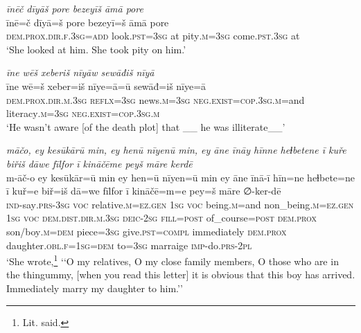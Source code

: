 \ea \label{KŠ.73}
\textit{īnēč dīyāš pore bezeyīš āmā pore} \\ 
\gll īnē=č dīyā=š pore bezeyī=š āmā pore \\ 
 \textsc{dem.prox}\textsc{.dir}\textsc{.f}\textsc{.3sg}\textsc{=add} look\textsc{.pst}\textsc{=3sg} at pity\textsc{.m}\textsc{=3sg} come\textsc{.pst}\textsc{.3sg} at \\ 
\glt `She looked at him. She took pity on him.'
\z 
 
\ea \label{KŠ.76}
\textit{īne wēš xeberiš nīyāw sewāđiš nīyā} \\ 
\gll īne wē=š xeber=iš nīye=ā=ū sewāđ=iš nīye=ā \\ 
 \textsc{dem.prox}\textsc{.dir}\textsc{.m}\textsc{.3sg} \textsc{reflx}\textsc{=3sg} news\textsc{.m}\textsc{=3sg} \textsc{\textsc{neg.}exist}\textsc{=cop}\textsc{.3sg}\textsc{.m}=and literacy\textsc{.m}\textsc{=3sg} \textsc{\textsc{neg.}exist}\textsc{=cop}\textsc{.3sg}\textsc{.m} \\ 
\glt `He wasn’t aware [of the death plot] that \_\_ he was illiterate\_\_'
\z 
 
\ea \label{KŠ.80}
\textit{māčo, ey kesūkārū min, ey henū nīyenū min, ey āne īnāy hīnne heɫbetene ī kuře biřiš dāwe fīlfor ī kināčēme peyš māre kerdē} \\ 
\gll m-āč-o ey kesūkār=ū min ey hen=ū nīyen=ū min ey āne īnā-ī hīn=ne heɫbete=ne ī kuř=e biř=iš dā=we fīlfor ī kināčē=m=e pey=š māre ∅-ker-dē \\ 
 \textsc{ind-}say\textsc{.prs}\textsc{-3sg} \textsc{voc} relative\textsc{.m}\textsc{\textsc{=ez.gen}} \textsc{1sg} \textsc{voc} being\textsc{.m}=and non\_being\textsc{.m}\textsc{\textsc{=ez.gen}} \textsc{1sg} \textsc{voc} \textsc{dem.dist}\textsc{.dir}\textsc{.m}\textsc{.3sg} \textsc{deic}-\textsc{2sg} \textsc{fill}\textsc{=\textsc{post}} of\_course\textsc{=\textsc{post}} \textsc{dem.prox} son/boy\textsc{.m}\textsc{=dem} piece\textsc{=3sg} give\textsc{.pst}\textsc{=compl} immediately \textsc{dem.prox} daughter\textsc{.obl}\textsc{.f}\textsc{=\textsc{1sg}}\textsc{=dem} to\textsc{=3sg} marraige \textsc{imp-}do\textsc{.prs}-\textsc{2pl} \\ 
\glt `She wrote,\footnote{Lit. said.} ‘‘O my relatives, O my close family members, O those who are in the thingummy, [when you read this letter] it is obvious that this boy has arrived. Immediately marry my daughter to him.’'
\z 
 
